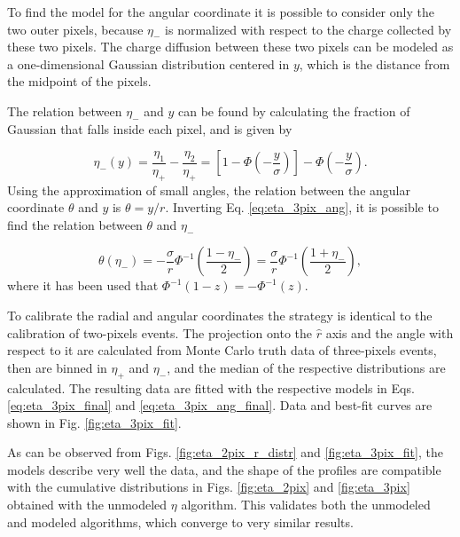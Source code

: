 To find the model for the angular coordinate it is possible to consider only the two outer pixels, because $\eta_-$ is normalized with respect to the charge collected by these two pixels. The charge diffusion between these two pixels can be modeled as a one-dimensional Gaussian distribution centered in $y$, which is the distance from the midpoint of the pixels.

The relation between $\eta_-$ and $y$ can be found by calculating the fraction of Gaussian that falls inside each pixel, and is given by

\begin{equation}
\eta_-(y) = \frac{\eta_1}{\eta_+} - \frac{\eta_2}{\eta_+} = \left[1 - \Phi \left( - \frac{y}{\sigma} \right ) \right] - \Phi \left( - \frac{y}{\sigma} \right).
\label{eq:eta_3pix_ang}
\end{equation}
Using the approximation of small angles, the relation between the angular coordinate $\theta$ and $y$ is $\theta = y / r$. Inverting Eq. \ref{eq:eta_3pix_ang}, it is possible to find the relation between $\theta$ and $\eta_-$

\begin{equation}
\theta(\eta_-) =  - \frac{\sigma}{r} \Phi^{-1} \left( \frac{1 - \eta_-}{2} \right) = \frac{\sigma}{r} \Phi^{-1} \left( \frac{1 + \eta_-}{2} \right),
\label{eq:eta_3pix_ang_final}
\end{equation}
where it has been used that $\Phi^{-1}(1 - z) = - \Phi^{-1}(z)$.

To calibrate the radial and angular coordinates the strategy is identical to the calibration of two-pixels events. The projection onto the $\hat{r}$ axis and the angle with respect to it are calculated from Monte Carlo truth data of three-pixels events, then are binned in $\eta_+$ and $\eta_-$, and the median of the respective distributions are calculated. The resulting data are fitted with the respective models in Eqs. \ref{eq:eta_3pix_final} and \ref{eq:eta_3pix_ang_final}. Data and best-fit curves are shown in Fig. \ref{fig:eta_3pix_fit}.

As can be observed from Figs. \ref{fig:eta_2pix_r_distr} and \ref{fig:eta_3pix_fit}, the models describe very well the data, and the shape of the profiles are compatible with the cumulative distributions in Figs. \ref{fig:eta_2pix} and \ref{fig:eta_3pix} obtained with the unmodeled $\eta$ algorithm. This validates both the unmodeled and modeled algorithms, which converge to very similar results.

